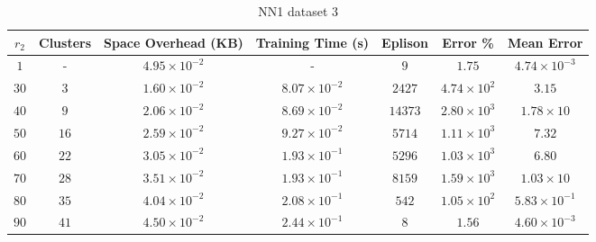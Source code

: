 \begin{adjustwidth}{-1cm}{}
\begin{table}
\caption{NN1 dataset 3}\label{ws13}
\begin{tabular}{ccccccc}
\hline
\toprule
$r_2$ & Clusters & Space Overhead (KB) & Training Time (s) & Eplison & Error \% & Mean Error\\
\midrule
$1$ & - & $4.95 \times 10^{-2}$ & - & $9$ & $1.75$ & $4.74 \times 10^{-3}$\\
$30$ & $3$ & $1.60 \times 10^{-2}$ & $8.07 \times 10^{-2}$ & $2427$ & $4.74 \times 10^2$ & $3.15$\\
$40$ & $9$ & $2.06 \times 10^{-2}$ & $8.69 \times 10^{-2}$ & $14373$ & $2.80 \times 10^3$ & $1.78 \times 10$\\
$50$ & $16$ & $2.59 \times 10^{-2}$ & $9.27 \times 10^{-2}$ & $5714$ & $1.11 \times 10^3$ & $7.32$\\
$60$ & $22$ & $3.05 \times 10^{-2}$ & $1.93 \times 10^{-1}$ & $5296$ & $1.03 \times 10^3$ & $6.80$\\
$70$ & $28$ & $3.51 \times 10^{-2}$ & $1.93 \times 10^{-1}$ & $8159$ & $1.59 \times 10^3$ & $1.03 \times 10$\\
$80$ & $35$ & $4.04 \times 10^{-2}$ & $2.08 \times 10^{-1}$ & $542$ & $1.05 \times 10^2$ & $5.83 \times 10^{-1}$\\
$90$ & $41$ & $4.50 \times 10^{-2}$ & $2.44 \times 10^{-1}$ & $8$ & $1.56$ & $4.60 \times 10^{-3}$\\
\bottomrule
\end{tabular}
\end{table}
\end{adjustwidth}

\par\null\par
\par\null\par

